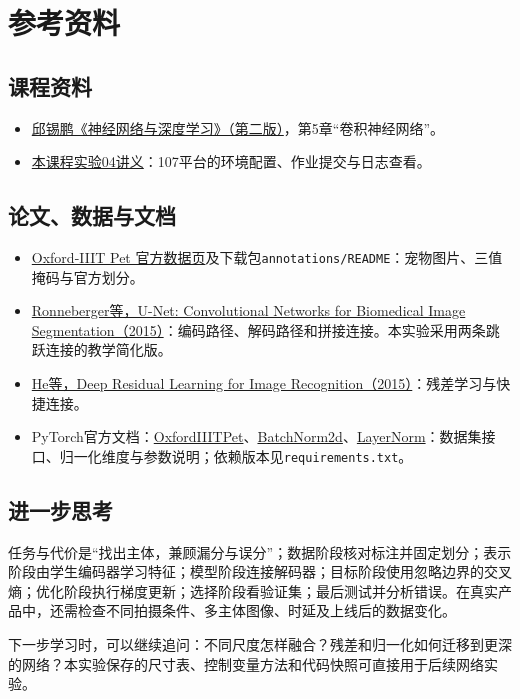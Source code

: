 \documentclass[UTF8,a4paper,11pt,fontset=fandol]{ctexart}
\newcommand{\file}[1]{\nolinkurl{#1}}
\begin{document}
\section{参考资料}
\subsection{课程资料}
\begin{itemize}
\item \href{https://nndl.ai/nndl-v2/}{邱锡鹏《神经网络与深度学习》（第二版）}，第5章“卷积神经网络”。
\item \href{https://github.com/Aster-Letter/ustc-ai-math-experiments-26fall-b/tree/main/\%E5\%AE\%9E\%E9\%AA\%8C04_AI-Harness\%E5\%B7\%A5\%E5\%85\%B7\%E9\%85\%8D\%E7\%BD\%AE\%E5\%8F\%8A107\%E6\%9C\%AC\%E7\%A7\%91\%E7\%94\%9F\%E7\%AE\%97\%E5\%8A\%9B\%E5\%B9\%B3\%E5\%8F\%B0\%E4\%BB\%8B\%E7\%BB\%8D}{本课程实验04讲义}：107平台的环境配置、作业提交与日志查看。
\end{itemize}
\subsection{论文、数据与文档}
\begin{itemize}
\item \href{https://www.robots.ox.ac.uk/~vgg/data/pets/}{Oxford-IIIT Pet 官方数据页}及下载包\file{annotations/README}：宠物图片、三值掩码与官方划分。
\item \href{https://arxiv.org/abs/1505.04597}{Ronneberger等，U-Net: Convolutional Networks for Biomedical Image Segmentation（2015）}：编码路径、解码路径和拼接连接。本实验采用两条跳跃连接的教学简化版。
\item \href{https://arxiv.org/abs/1512.03385}{He等，Deep Residual Learning for Image Recognition（2015）}：残差学习与快捷连接。
\item PyTorch官方文档：\href{https://docs.pytorch.org/vision/0.22/generated/torchvision.datasets.OxfordIIITPet.html}{OxfordIIITPet}、\href{https://docs.pytorch.org/docs/2.7/generated/torch.nn.BatchNorm2d.html}{BatchNorm2d}、\href{https://docs.pytorch.org/docs/2.7/generated/torch.nn.LayerNorm.html}{LayerNorm}：数据集接口、归一化维度与参数说明；依赖版本见\file{requirements.txt}。
\end{itemize}
\subsection{进一步思考}
任务与代价是“找出主体，兼顾漏分与误分”；数据阶段核对标注并固定划分；表示阶段由学生编码器学习特征；模型阶段连接解码器；目标阶段使用忽略边界的交叉熵；优化阶段执行梯度更新；选择阶段看验证集；最后测试并分析错误。在真实产品中，还需检查不同拍摄条件、多主体图像、时延及上线后的数据变化。

下一步学习时，可以继续追问：不同尺度怎样融合？残差和归一化如何迁移到更深的网络？本实验保存的尺寸表、控制变量方法和代码快照可直接用于后续网络实验。
\end{document}

